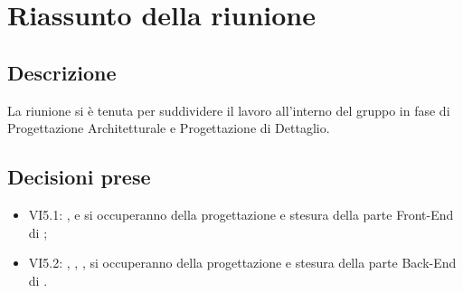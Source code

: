 \section{Riassunto della riunione}
\subsection{Descrizione}

La riunione si è tenuta per suddividere il lavoro all'interno del gruppo in fase di Progettazione Architetturale e Progettazione di Dettaglio. 

\subsection{Decisioni prese}
\begin{itemize}
\item VI5.1: \GR, \SM e \AF si occuperanno della progettazione e stesura della parte Front-End di \progetto;
\item VI5.2: \GN, \FB, \MP, \MV si occuperanno della progettazione e stesura della parte Back-End di \progetto.
\end{itemize}
